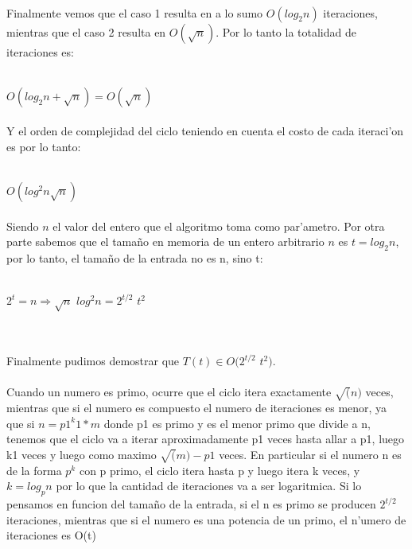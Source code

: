 \paragraph{}
Finalmente vemos que el caso 1 resulta en a lo sumo $O(log_2 n)$ iteraciones, mientras que
el caso 2 resulta en $O(\sqrt{n})$. Por lo tanto la totalidad de iteraciones es:\\
\\
\centerline{$O(log_2 n + \sqrt{n}) = O(\sqrt{n})$}
\paragraph{}
Y el orden de complejidad del ciclo teniendo en cuenta el costo de cada iteraci'on es por lo tanto:\\
\\
\centerline{$O(log^2 n \sqrt{n})$}
\paragraph{}
Siendo $n$ el valor del entero que el algoritmo toma como par'ametro. Por otra parte sabemos que 
el tama\~{n}o en memoria de un entero arbitrario $n$ es $t = log_2 n$, por lo tanto, el tama\~{n}o de la entrada no es n, sino t:\\
\\
\centerline{$2^t = n \Rightarrow \sqrt{n}$ $log^2 n = 2^{t/2}$ $t^2$}
\\
\paragraph{}
Finalmente pudimos demostrar que $T(t) \in O(2^{t/2} $ $t^2)$.
\paragraph{}
Cuando un numero es primo, ocurre que el ciclo itera exactamente $\sqrt(n)$ veces, mientras que si el numero es compuesto el numero de iteraciones es menor, ya que si $n = p1^k1*m$ donde p1 es primo y es el menor primo que divide a n, tenemos que el ciclo va a iterar aproximadamente p1 veces hasta allar a p1, luego k1 veces y luego como maximo $\sqrt(m)-p1$ veces. En particular si el numero n es de la forma $p^k$ con p primo, el ciclo itera hasta p y luego itera k veces, y $k=log_p n$ por lo que la cantidad de iteraciones va a ser logaritmica. Si lo pensamos en funcion del tama\~{n}o de la entrada, si el n es primo se producen $2^{t/2}$ iteraciones, mientras que si el numero es una potencia de un primo, el n'umero de iteraciones es O(t)


